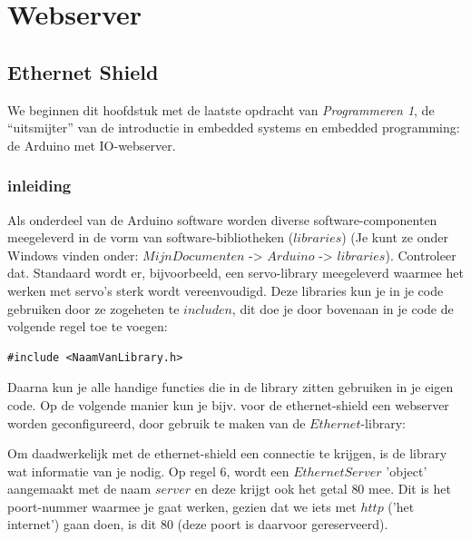 \chapter{Webserver}

\section{Ethernet Shield}


We beginnen dit hoofdstuk met de laatste opdracht van \textit{Programmeren 1}, de “uitsmijter” van de introductie in embedded systems en embedded programming: de Arduino met IO-webserver.

\subsection*{inleiding}
Als onderdeel van de Arduino software worden diverse software-componenten meegeleverd in de vorm van software-bibliotheken ($libraries$) (Je kunt ze onder Windows vinden onder: $Mijn Documenten$ -> $Arduino$ -> $libraries$). Controleer dat. Standaard wordt er, bijvoorbeeld, een servo-library meegeleverd waarmee het werken met servo’s sterk wordt vereenvoudigd. Deze libraries kun je in je code gebruiken door ze zogeheten te $includen$, dit doe je door bovenaan in je code de volgende regel toe te voegen:

\begin{lstlisting}[language=Arduino]
#include <NaamVanLibrary.h>
\end{lstlisting}

Daarna kun je alle handige functies die in de library zitten gebruiken in je eigen code. Op de volgende manier kun je bijv. voor de ethernet-shield een webserver worden geconfigureerd, door gebruik te maken van de $Ethernet$-library: \newline



Om daadwerkelijk met de ethernet-shield een connectie te krijgen, is de library wat informatie van je nodig. Op regel $6$, wordt een $EthernetServer$ 'object' aangemaakt met de naam $server$ en deze krijgt ook het getal $80$ mee. Dit is het poort-nummer waarmee je gaat werken, gezien dat we iets met $http$ ('het internet') gaan doen, is dit $80$ (deze poort is daarvoor gereserveerd). \newline

